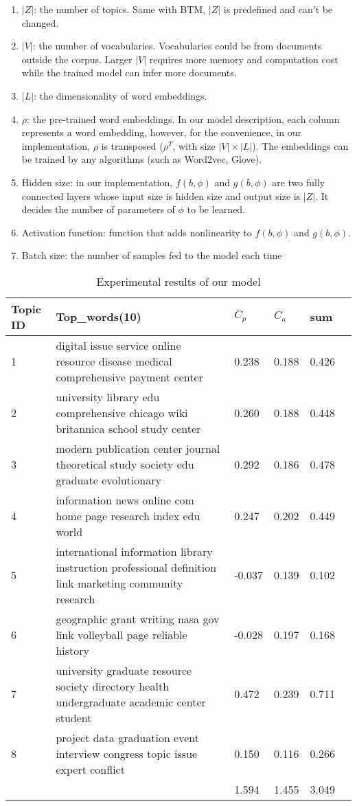 \begin{enumerate}
    \item $|Z|$: the number of topics. Same with BTM, $|Z|$ is predefined and can't be changed.
    \item $|V|$: the number of vocabularies. Vocabularies could be from documents outside the corpus. Larger $|V|$ requires more memory and computation cost while the trained model can infer more documents.
    \item $|L|$: the dimensionality of word embeddings. 
    \item $\rho$: the pre-trained word embeddings. In our model description, each column represents a word embedding, however, for the convenience, in our implementation, $\rho$ is transposed ($\rho^T$, with size $|V|\times|L|$). The embeddings can be trained by any algorithms (such as Word2vec, Glove). 
    \item Hidden size: in our implementation, $f(b,\phi)$ and $g(b,\phi)$ are two fully connected layers whose input size is hidden size and output size is $|Z|$. It decides the number of parameters of $\phi$ to be learned.
    \item Activation function: function that adds nonlinearity to $f(b,\phi)$ and $g(b,\phi)$.
    \item Batch size: the number of samples fed to the model each time
\end{enumerate}
\begin{table}[!htbp]
    \centering
    \hspace{0.5cm}
    \begin{tabular}{|p{45pt}|p{210pt}|p{30pt}|p{30pt}|p{30pt}|p{30pt}|}
        \hline
        Topic ID & Top\_words(10) & $C_p$ & $C_a$ & sum\\ \hline
        1 & digital issue service online resource disease medical comprehensive payment center & 0.238 & 0.188 & 0.426\\\hline
    2 & university library edu comprehensive chicago wiki britannica school study center & 0.260 & 0.188 & 0.448\\\hline
    3 & modern publication center journal theoretical study society edu graduate evolutionary & 0.292 & 0.186 & 0.478\\\hline
    4 & information news online com home page research index edu world & 0.247 & 0.202 & 0.449\\\hline
    5 & international information library instruction professional definition link marketing community research & -0.037 & 0.139 & 0.102\\\hline
    6 & geographic grant writing nasa gov link volleyball page reliable history & -0.028 & 0.197 & 0.168\\\hline
    7 & university graduate resource society directory health undergraduate academic center student & 0.472 & 0.239 & 0.711\\\hline
    8 & project data graduation event interview congress topic issue expert conflict & 0.150 & 0.116 & 0.266\\\hline
    & & 1.594 & 1.455 & 3.049\\\hline
    \end{tabular}
    \caption{Experimental results of our model}
    \label{tab:EBTM1}
\end{table}
